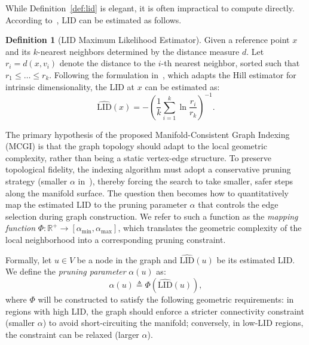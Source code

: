 \documentclass{article}
\theoremstyle{plain}
\theoremstyle{definition}
\newtheorem{definition}[theorem]{Definition}
\theoremstyle{remark}
\begin{document}
While Definition~\ref{def:lid} is elegant, it is often impractical to compute directly. According to~\cite{10.1145/2783258.2783405}, LID can be estimated as follows.

\begin{definition}[LID Maximum Likelihood Estimator]
\label{def:lid_mle}
Given a reference point $x$ and its $k$-nearest neighbors determined by the distance measure $d$.
Let $r_i = d(x, v_i)$ denote the distance to the $i$-th nearest neighbor, sorted such that $r_1 \le \dots \le r_k$. 
Following the formulation in~\cite{10.1145/2783258.2783405}, which adapts the Hill estimator for intrinsic dimensionality, the LID at $x$ can be estimated as:
\begin{equation}
    \widehat{\text{LID}}(x) = - \left( \frac{1}{k} \sum_{i=1}^{k} \ln \frac{r_i}{r_k} \right)^{-1}.
\end{equation}
\end{definition}

The primary hypothesis of the proposed Manifold-Consistent Graph Indexing (MCGI) is that the graph topology should adapt to the local geometric complexity, rather than being a static vertex-edge structure. 
To preserve topological fidelity, the indexing algorithm must adopt a conservative pruning strategy (smaller $\alpha$ in~\cite{subramanya2019diskann}), thereby forcing the search to take smaller, safer steps along the manifold surface.
The question then becomes how to quantitatively map the estimated LID to the pruning parameter $\alpha$ that controls the edge selection during graph construction.
We refer to such a function as the \textit{mapping function} $\Phi: \mathbb{R}^+ \to [\alpha_{\min}, \alpha_{\max}]$, which translates the geometric complexity of the local neighborhood into a corresponding pruning constraint.

Formally, let $u \in V$ be a node in the graph and $\widehat{\text{LID}}(u)$ be its estimated LID. We define the \emph{pruning parameter} $\alpha(u)$ as:
\begin{equation}
    \alpha(u) \triangleq \Phi( \widehat{\text{LID}}(u) ),
\end{equation}
where $\Phi$ will be constructed to satisfy the following geometric requirements: in regions with high LID, the graph should enforce a stricter connectivity constraint (smaller $\alpha$) to avoid short-circuiting the manifold; conversely, in low-LID regions, the constraint can be relaxed (larger $\alpha$).
\end{document}
